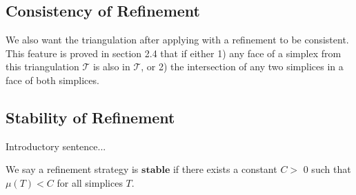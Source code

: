     \subsection{Consistency of Refinement}
    We also want the triangulation after applying with a refinement to be consistent. This feature is proved in section 2.4 that if either 1) any face of a simplex from this triangulation $\mathcal{T}$ is also in $\mathcal{T}$, or 2) the intersection of any two simplices in a face of both simplices.

    \subsection{Stability of Refinement}
    Introductory sentence...
    \begin{definition*}
    We say a refinement strategy is $\textbf{stable}$ if there exists a constant $C >$ 0 such that $\mu(T)< C$ for all simplices $T$.
    \end{definition*}
    

